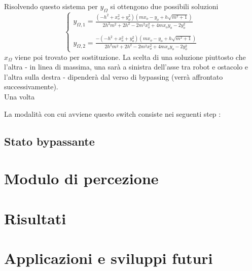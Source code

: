 \documentclass[14pt,a4paper]{extarticle}
\begin{document}
Risolvendo questo sistema per \(y_{\Omega}\) si ottengono due possibili soluzioni
\begin{equation}
\begin{cases}
y_{\Omega,1}=\frac{(-h^2 + x_o^2 + y_o^2)(m x_o - y_o + h\sqrt{m^2+1})}{2h^2m^2 + 2h^2 - 2m^2x_o^2 + 4mx_oy_o - 2y_o^2} \\\\
y_{\Omega,2}=\frac{-(-h^2 + x_o^2 + y_o^2)(m x_o - y_o + h\sqrt{m^2+1})}{2h^2m^2 + 2h^2 - 2m^2x_o^2 + 4mx_oy_o - 2y_o^2}
\end{cases}
\end{equation}
\(x_{\Omega}\) viene poi trovato per sostituzione. La scelta di una soluzione piuttosto che l'altra - in linea di massima, una sarà a sinistra dell'asse tra robot e ostacolo e l'altra sulla destra - dipenderà dal verso di bypassing (verrà affrontato successivamente).\\
Una volta 

La modalità con cui avviene questo switch consiste nei seguenti step :
	
	
\subsection{Stato bypassante}

\section{Modulo di percezione}


\section{Risultati}

\section{Applicazioni e sviluppi futuri}

\newpage
%

\newpage \lstlistoflistings 
\listoffigures
\newpage\printbibliography
\end{document}
